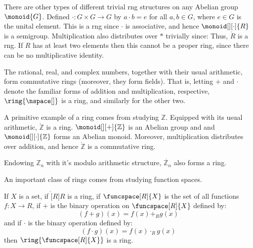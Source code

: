 \documentclass{article}                                                        %
\begin{document}
        \begin{example}
            There are other types of different trivial rng structures on any
            Abelian group $\monoid{G}$. Defined $\cdot:G\times{G}\rightarrow{G}$
            by $a\cdot{b}=e$ for all $a,b\in{G}$, where $e\in{G}$ is the unital
            element. This is a rng since $\cdot$ is associative, and hence
            $\monoid[][\cdot]{R}$ is a semigroup. Multiplication also
            distributes over $*$ trivially since:
            \vspace{-2.5ex}
            Thus, $\ring{R}$ is a rng. If $R$ has at least two elements then
            this cannot be a proper ring, since there can be no multiplicative
            identity.
        \end{example}
        \begin{example}
            The rational, real, and complex numbers, together with their usual
            arithmetic, form commutative rings (moreover, they form fields).
            That is, letting $+$ and $\cdot$ denote the familiar forms of
            addition and multiplication, respective, $\ring{\nspace[]}$ is a
            ring, and similarly for the other two.
        \end{example}
        \begin{example}
            A primitive example of a ring comes from studying $\mathbb{Z}$.
            Equipped with its usual arithmetic, $\ring{\mathbb{Z}}$ is a ring.
            $\monoid[][+]{\mathbb{Z}}$ is an Abelian group and and
            $\monoid[][\cdot]{\mathbb{Z}}$ forms an Abelian monoid. Moreover,
            multiplication distributes over addition, and hence
            $\ring{\mathbb{Z}}$ is a commutative ring.
        \end{example}
        \begin{example}
            Endowing $\mathbb{Z}_{n}$ with it's modulo arithmetic structure,
            $\ring{\mathbb{Z}_{n}}$ also forms a ring.
        \end{example}
        An important class of rings comes from studying function spaces.
        \begin{theorem}
            \label{thm:Ring_of_Funcs_is_Ring}%
            If $X$ is a set, if $\ring[R]{R}$ is a ring, if
            $\funcspace[R]{X}$ is the set of all functions $f:X\rightarrow{R}$,
            if $+$ is the binary operation on $\funcspace[R]{X}$ defined by:
            \begin{equation}
                (f+g)(x)=f(x)+_{R}g(x)
            \end{equation}
            and if $\cdot$ is the binary operation defined by:
            \begin{equation}
                (f\cdot{g})(x)=f(x)\cdot_{R}g(x)
            \end{equation}
            then $\ring{\funcspace[R]{X}}$ is a ring.
        \end{theorem}
\end{document}
